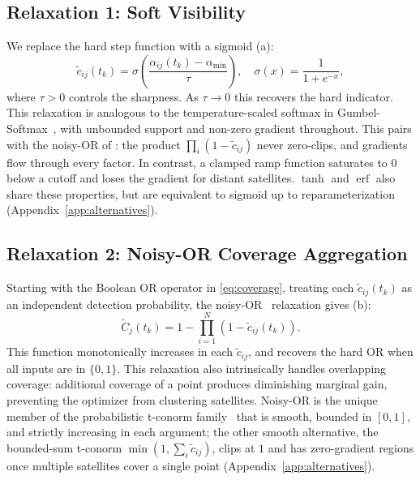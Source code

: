 \subsection{Relaxation 1: Soft Visibility}
\label{sec:soft_visibility}

We replace the hard step function with a sigmoid (a):
\begin{equation}
    \tilde{c}_{ij}(t_k) = \sigma\!\left(\frac{\alpha_{ij}(t_k) - \alpha_{\min}}{\tau}\right), \quad \sigma(x) = \frac{1}{1 + e^{-x}},
    \label{eq:soft_visibility}
\end{equation}
where $\tau > 0$ controls the sharpness.
As $\tau \to 0$ this recovers the hard indicator.
This relaxation is analogous to the temperature-scaled softmax in Gumbel-Softmax~\citep{jang_categorical_2017}, with unbounded support and non-zero gradient throughout. This pairs with the noisy-OR of : the product $\prod_i(1 - \tilde{c}_{ij})$ never zero-clips, and gradients flow through every factor. In contrast, a clamped ramp function saturates to $0$ below a cutoff and loses the gradient for distant satellites. $\tanh$ and $\operatorname{erf}$ also share these properties, but are equivalent to sigmoid up to reparameterization (Appendix~\ref{app:alternatives}).


\subsection{Relaxation 2: Noisy-OR Coverage Aggregation}
\label{sec:noisy_or}

Starting with the Boolean OR operator in \eqref{eq:coverage}, treating each $\tilde{c}_{ij}(t_k)$ as an independent detection probability, the noisy-OR~\citep{pearl_probabilistic_2014} relaxation gives (b):
\begin{equation}
    \tilde{C}_j(t_k) = 1 - \prod_{i=1}^{N} \left(1 - \tilde{c}_{ij}(t_k)\right).
    \label{eq:noisy_or}
\end{equation}
This function monotonically increases in each $\tilde{c}_{ij}$, and recovers the hard OR when all inputs are in $\{0, 1\}$.
This relaxation also intrinsically handles overlapping coverage: additional coverage of a point produces diminishing marginal gain, preventing the optimizer from clustering satellites.
Noisy-OR is the unique member of the probabilistic t-conorm family~\citep{klement_triangular_2000} that is smooth, bounded in $[0,1]$, and strictly increasing in each argument; the other smooth alternative, the bounded-sum t-conorm $\min(1, \sum_i \tilde{c}_{ij})$, clips at $1$ and has zero-gradient regions once multiple satellites cover a single point (Appendix~\ref{app:alternatives}).

